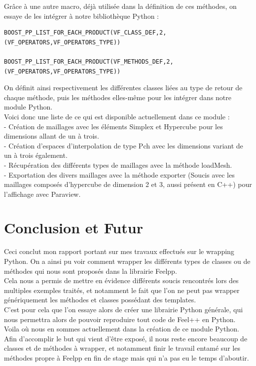 \documentclass[french,12pt]{article}
\begin{document}
Grâce à une autre macro, déjà utilisée dans la définition de ces méthodes, on essaye de les intégrer à notre bibliothèque Python :
\begin{lstlisting}
BOOST_PP_LIST_FOR_EACH_PRODUCT(VF_CLASS_DEF,2,(VF_OPERATORS,VF_OPERATORS_TYPE))

BOOST_PP_LIST_FOR_EACH_PRODUCT(VF_METHODS_DEF,2,(VF_OPERATORS,VF_OPERATORS_TYPE))
\end{lstlisting}

On définit ainsi respectivement les différentes classes liées au type de retour de chaque méthode, puis les méthodes elles-même pour les intégrer dans notre module Python.\\

Voici donc une liste de ce qui est disponible actuellement dans ce module :\\
- Création de maillages avec les éléments Simplex et Hypercube pour les dimensions allant de un à trois.\\
- Création d'espaces d'interpolation de type Pch avec les dimensions variant de un à trois également.\\
- Récupération des différents types de maillages avec la méthode loadMesh.\\
- Exportation des divers maillages avec la méthode exporter (Soucis avec les maillages composés d'hypercube de dimension 2 et 3, aussi présent en C++) pour l'affichage avec Paraview.\\

\section{Conclusion et Futur}
Ceci conclut mon rapport portant sur mes travaux effectués sur le wrapping Python. On a ainsi pu voir comment wrapper les différents types de classes ou de méthodes qui nous sont proposés dans la librairie Feelpp.\\

Cela nous a permis de mettre en évidence différents soucis rencontrés lors des multiples exemples traités,  et notamment le fait que l'on ne peut pas wrapper génériquement les méthodes et classes possédant des templates.\\

C'est pour cela que l'on essaye alors de créer une librairie Python générale, qui nous permettra alors de pouvoir reproduire tout code de Feel++ en Python.\\

Voila où nous en sommes actuellement dans la création de ce module Python. Afin d'accomplir le but qui vient d'être exposé, il nous reste encore beaucoup de classes et de méthodes à wrapper, et notamment finir le travail entamé sur les méthodes propre à Feelpp en fin de stage mais qui n'a pas eu le temps d'aboutir.\\
\end{document}
